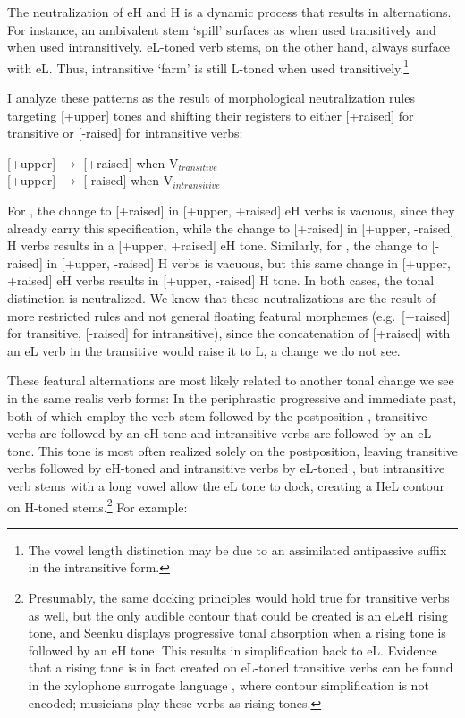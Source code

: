 \documentclass[output=paper]{langsci/langscibook}
\begin{document}
The neutralization of eH and H is a dynamic process that results in alternations. For instance, an ambivalent stem {\it {}} `spill' surfaces as {\it {}} when used transitively and {\it {}} when used intransitively. eL-toned verb stems, on the other hand, always surface with eL. Thus, intransitive {\it {}} `farm' is still L-toned {\it {}} when used transitively.\footnote{The vowel length distinction may be due to an assimilated antipassive suffix in the intransitive form.}

I analyze these patterns as the result of morphological neutralization rules targeting [+upper] tones and shifting their registers to either [+raised] for transitive or [-raised] for intransitive verbs:

\ea\label{ex:mcpherson:13} 
\ea\label{ex:mcpherson:13a} {[}+upper] $\rightarrow$ [+raised] when V$_{transitive}$ \\
\ex\label{ex:mcpherson:13b} {[}+upper] $\rightarrow$ [-raised] when V$_{intransitive}$ \\ 
\z
\z

For , the change to [+raised] in [+upper, +raised] eH verbs is vacuous, since they already carry this specification, while the change to [+raised] in [+upper, -raised] H verbs results in a [+upper, +raised] eH tone. Similarly, for , the change to [-raised] in [+upper, -raised] H verbs is vacuous, but this same change in [+upper, +raised] eH verbs results in [+upper, -raised] H tone. In both cases, the tonal distinction is neutralized. We know that these neutralizations are the result of more restricted rules and not general floating featural morphemes (e.g.\ [+raised] for transitive, [-raised] for intransitive), since the concatenation of [+raised] with an eL verb in the transitive would raise it to L, a change we do not see.

These featural alternations are most likely related to another tonal change we see in the same realis verb forms: In the periphrastic progressive and immediate past, both of which employ the verb stem followed by the postposition {\it {}}, transitive verbs are followed by an eH tone and intransitive verbs are followed by an eL tone. This tone is most often realized solely on the postposition, leaving transitive verbs followed by eH-toned {\it {}} and intransitive verbs by eL-toned {\it {}}, but intransitive verb stems with a long vowel allow the eL tone to dock, creating a HeL contour on H-toned stems.\footnote{Presumably, the same docking principles would hold true for transitive verbs as well, but the only audible contour that could be created is an eLeH rising tone, and Seenku displays progressive tonal absorption \citep{HymanSchuh74} when a rising tone is followed by an eH tone. This results in simplification back to eL. Evidence that a rising tone is in fact created on eL-toned transitive verbs can be found in the xylophone surrogate language \citep{McPherson16}, where contour simplification is not encoded; musicians play these verbs as rising tones.} For example:
\end{document}
